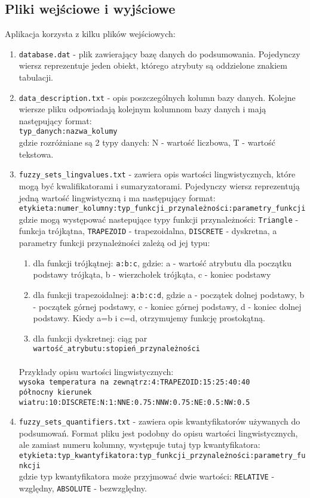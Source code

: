 \documentclass{classrep}
\begin{document}
\subsection{Pliki wejściowe i wyjściowe}
Aplikacja korzysta z kilku plików wejściowych:
\begin{enumerate}
\item \verb|database.dat| - plik zawierający bazę danych do podsumowania. Pojedynczy wiersz reprezentuje jeden obiekt, którego atrybuty są oddzielone znakiem tabulacji.
\item \verb|data_description.txt| - opis poszczególnych kolumn bazy danych. Kolejne wiersze pliku odpowiadają kolejnym kolumnom bazy danych i mają następujący format:\\
\verb|typ_danych:nazwa_kolumy|\\
gdzie rozróżniane są 2 typy danych: N - wartość liczbowa, T - wartość tekstowa.
\item \verb|fuzzy_sets_lingvalues.txt| - zawiera opis wartości lingwistycznych, które mogą być kwalifikatorami i sumaryzatorami. Pojedynczy wiersz reprezentują jedną wartość lingwistyczną i ma następujący format:\\
\verb|etykieta:numer_kolumny:typ_funkcji_przynależności:parametry_funkcji|
gdzie mogą występować nastepujące typy funkcji przynależności: \verb|Triangle| - funkcja trójkątna, \verb|TRAPEZOID| - trapezoidalna, \verb|DISCRETE| - dyskretna, 
a parametry funkcji przynależności zależą od jej typu:
\begin{enumerate}
\item dla funkcji trójkątnej: \verb|a:b:c|, gdzie: a - wartość atrybutu dla początku podstawy trójkąta, b - wierzchołek trójkąta, c - koniec podstawy
\item dla funkcji trapezoidalnej: \verb|a:b:c:d|, gdzie a - początek dolnej podstawy, b - początek górnej podstawy, c - koniec górnej podstawy, d - koniec dolnej podstawy. Kiedy a=b i c=d, otrzymujemy funkcję prostokątną.
\item dla funkcji dyskretnej: ciąg par \verb|wartość_atrybutu:stopień_przynależności|
\end{enumerate}

\paragraph{}
Przykłady opisu wartości lingwistycznych:\\
\verb|wysoka temperatura na zewnątrz:4:TRAPEZOID:15:25:40:40|\\
\verb|północny kierunek wiatru:10:DISCRETE:N:1:NNE:0.75:NNW:0.75:NE:0.5:NW:0.5|\\

\item \verb|fuzzy_sets_quantifiers.txt| - zawiera opis kwantyfikatorów używanych do podsumowań. Format pliku jest podobny do opisu wartości lingwistycznych, ale zamiast numeru kolumny, występuje tutaj typ kwantyfikatora:\\
\verb|etykieta:typ_kwantyfikatora:typ_funkcji_przynależności:parametry_funkcji|\\
gdzie typ kwantyfikatora może przyjmować dwie wartości: \verb|RELATIVE| - względny, \verb|ABSOLUTE| - bezwzględny. 
\end{enumerate}
\end{document}
